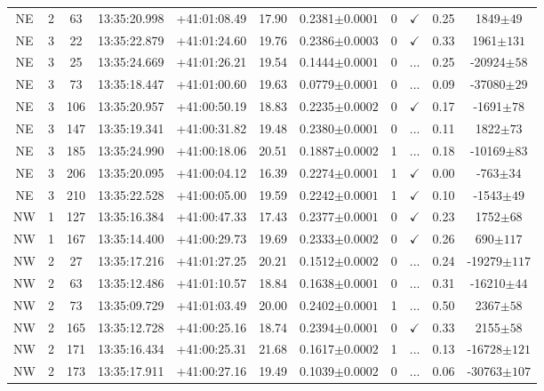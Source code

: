 \begin{landscape}
\begin{longtable}{ccccccccccc}
	NE & 2 & 63 & 13:35:20.998 & +41:01:08.49 & 17.90 & 0.2381$\pm{0.0001}$ & 0 & $\checkmark$ & 0.25 & 1849$\pm{49}$ \\
	NE & 3 & 22 & 13:35:22.879 & +41:01:24.60 & 19.76 & 0.2386$\pm{0.0003}$ & 0 & $\checkmark$ & 0.33 & 1961$\pm{131}$ \\
	NE & 3 & 25 & 13:35:24.669 & +41:01:26.21 & 19.54 & 0.1444$\pm{0.0001}$ & 0 & ... & 0.25 & -20924$\pm{58}$ \\
	NE & 3 & 73 & 13:35:18.447 & +41:01:00.60 & 19.63 & 0.0779$\pm{0.0001}$ & 0 & ... & 0.09 & -37080$\pm{29}$ \\
	NE & 3 & 106 & 13:35:20.957 & +41:00:50.19 & 18.83 & 0.2235$\pm{0.0002}$ & 0 & $\checkmark$ & 0.17 & -1691$\pm{78}$ \\
	NE & 3 & 147 & 13:35:19.341 & +41:00:31.82 & 19.48 & 0.2380$\pm{0.0001}$ & 0 & ... & 0.11 & 1822$\pm{73}$ \\
	NE & 3 & 185 & 13:35:24.990 & +41:00:18.06 & 20.51 & 0.1887$\pm{0.0002}$ & 1 & ... & 0.18 & -10169$\pm{83}$ \\
	NE & 3 & 206 & 13:35:20.095 & +41:00:04.12 & 16.39 & 0.2274$\pm{0.0001}$ & 1 & $\checkmark$ & 0.00 & -763$\pm{34}$ \\
	NE & 3 & 210 & 13:35:22.528 & +41:00:05.00 & 19.59 & 0.2242$\pm{0.0001}$ & 1 & $\checkmark$ & 0.10 & -1543$\pm{49}$ \\
	NW & 1 & 127 & 13:35:16.384 & +41:00:47.33 & 17.43 & 0.2377$\pm{0.0001}$ & 0 & $\checkmark$ & 0.23 & 1752$\pm{68}$ \\
	NW & 1 & 167 & 13:35:14.400 & +41:00:29.73 & 19.69 & 0.2333$\pm{0.0002}$ & 0 & $\checkmark$ & 0.26 & 690$\pm{117}$ \\
	NW & 2 & 27 & 13:35:17.216 & +41:01:27.25 & 20.21 & 0.1512$\pm{0.0002}$ & 0 & ... & 0.24 & -19279$\pm{117}$ \\
	NW & 2 & 63 & 13:35:12.486 & +41:01:10.57 & 18.84 & 0.1638$\pm{0.0001}$ & 0 & ... & 0.31 & -16210$\pm{44}$ \\
	NW & 2 & 73 & 13:35:09.729 & +41:01:03.49 & 20.00 & 0.2402$\pm{0.0001}$ & 1 & ... & 0.50 & 2367$\pm{58}$ \\
	NW & 2 & 165 & 13:35:12.728 & +41:00:25.16 & 18.74 & 0.2394$\pm{0.0001}$ & 0 & $\checkmark$ & 0.33 & 2155$\pm{58}$ \\
	NW & 2 & 171 & 13:35:16.434 & +41:00:25.31 & 21.68 & 0.1617$\pm{0.0002}$ & 1 & ... & 0.13 & -16728$\pm{121}$ \\
	NW & 2 & 173 & 13:35:17.911 & +41:00:27.16 & 19.49 & 0.1039$\pm{0.0002}$ & 0 & ... & 0.06 & -30763$\pm{107}$ \\

\end{longtable}
\end{landscape}
